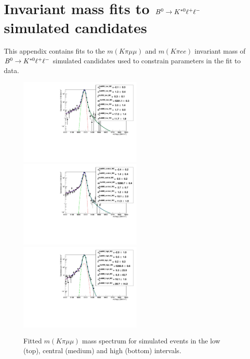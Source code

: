 \chapter{Invariant mass fits to $B^0\rightarrow K^{*0}\ell^+ \ell^-$ simulated candidates}
\label{app:RKMCfits}

This appendix contains fits to the $m(K\pi \mu\mu)$ and $m(K\pi ee )$ invariant mass of $B^0\rightarrow K^{*0}\ell^+ \ell^-$ simulated candidates
used to constrain parameters in the fit to data.

\begin{figure}[h!]
\centering
\includegraphics[width=0.55\textwidth]{RKst/figs/Fit/fit_MM/KstMM_low_MC_log.pdf} \\
\includegraphics[width=0.55\textwidth]{RKst/figs/Fit/fit_MM/KstMM_central_MC_log.pdf} \\
\includegraphics[width=0.55\textwidth]{RKst/figs/Fit/fit_MM/KstMM_high_MC_log.pdf}
\caption{Fitted $m(K\pi \mu\mu)$ mass spectrum for simulated events in the
low (top), central (medium) and high (bottom) \qsq intervals. }
\label{fig:mumu_MC_fits}
\end{figure}

